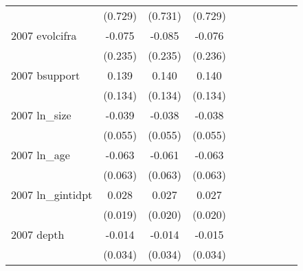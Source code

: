 \begin{table}[htbp]
\begin{tabular}{l*{9}{c}}
                    &     (0.729)   &     (0.731)   &     (0.729)   &               &               &               &               &               &               \\
2007 evolcifra      &      -0.075   &      -0.085   &      -0.076   &               &               &               &               &               &               \\
                    &     (0.235)   &     (0.235)   &     (0.236)   &               &               &               &               &               &               \\
2007 bsupport       &       0.139   &       0.140   &       0.140   &               &               &               &               &               &               \\
                    &     (0.134)   &     (0.134)   &     (0.134)   &               &               &               &               &               &               \\
2007 ln\_size        &      -0.039   &      -0.038   &      -0.038   &               &               &               &               &               &               \\
                    &     (0.055)   &     (0.055)   &     (0.055)   &               &               &               &               &               &               \\
2007 ln\_age         &      -0.063   &      -0.061   &      -0.063   &               &               &               &               &               &               \\
                    &     (0.063)   &     (0.063)   &     (0.063)   &               &               &               &               &               &               \\
2007 ln\_gintidpt    &       0.028   &       0.027   &       0.027   &               &               &               &               &               &               \\
                    &     (0.019)   &     (0.020)   &     (0.020)   &               &               &               &               &               &               \\
2007 depth          &      -0.014   &      -0.014   &      -0.015   &               &               &               &               &               &               \\
                    &     (0.034)   &     (0.034)   &     (0.034)   &               &               &               &               &               &               \\

\end{tabular}
\end{table}
